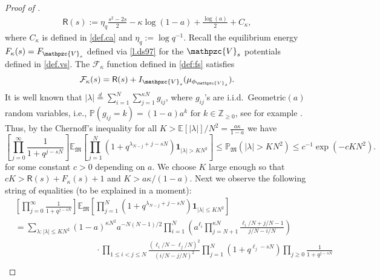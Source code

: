 \documentclass[reqno,11pt]{amsart}
\newcommand{\h}{\mathfrak{h}}
\renewcommand{\Pr}{\mathbb{P}}
\newcommand{\Ex}{\mathbb{E}}
\newcommand{\logq}{\eta_q}
\numberwithin{equation}{section}
\theoremstyle{definition}
\newcommand{\Z}{\mathbb{Z}}
\begin{document}
\begin{proof}[Proof of ]
\begin{align}
    \label{def:mrs}
    \mathsf{R}(s):=\logq\frac{s^2-2s}{2}-\kappa\log (1-a)+\frac{\log(a)}{2}+C_{\kappa},
\end{align} where $C_\kappa$ is defined in \eqref{def.ca} and $\logq:=\log q^{-1}$. Recall the equilibrium energy $F_\kappa(s)=F_{\mathpzc{V}_s}$ defined via \eqref{l.ds97} for the $\mathpzc{V}_s$ potentials defined in \eqref{def.vs}. The $\mathcal{F}_{\kappa}$ function defined in \eqref{def:fs} satisfies
\begin{align}
    \label{idenf}
    \mathcal{F}_\kappa(s)= \mathsf{R}(s)+I_{\mathpzc{V}_s}(\mu_{\phi_{\mathpzc{V}_s}}).
\end{align}
It is well known that $|\lambda|\stackrel{d}{=}\sum_{i=1}^N\sum_{j=1}^{\kappa N} g_{ij}$, where $g_{ij}$'s are i.i.d.~Geometric$(a)$ random variables, i.e., $\Pr(g_{ij}=k)=(1-a)a^k \mbox{ for } k\in \Z_{\ge 0}$, see for example \cite{Johansson_growth_matrices,johansson2000shape}. Thus, by the Chernoff's inequality for all $K>\Ex[|\lambda|]/N^2=\frac{a\kappa}{1-a}$  we have
    \begin{equation}\label{e.tail}
      \left[\prod_{j=0}^\infty \frac{1}{1+q^{j-sN}}\right]\mathbb{E}_{\mathfrak{M}}\left[\prod_{j=1}^N(1+q^{\lambda_{N-j}+j-sN})\mathbf{1}_{|\lambda|>KN^2}\right]  \le \mathbb{P}_{\mathfrak{M}}\left({|\lambda|>KN^2}\right) \le c^{-1}\exp(-cKN^2).
    \end{equation}
for some constant $c>0$ depending on $a$. 
We choose $K$ large enough so that $cK> \mathsf{R}(s)+F_\kappa(s)+1$ and $K>a\kappa/(1-a)$. Next we observe the following string of equalities (to be explained in a moment): 
\begin{align}
\label{e.smidens}
   &  \left[\prod_{j=0}^\infty \frac{1}{1+q^{j-sN}}\right]\mathbb{E}_{\mathfrak{M}}\left[\prod_{j=1}^N(1+q^{\lambda_{N-j}+j-sN})\mathbf{1}_{|\lambda| \le KN^2}\right]  %
   \\ \label{e.smiden3} & = \sum_{\lambda : |\lambda|\le KN^2}(1-a)^{\kappa N^2}a^{-N(N-1)/2}\prod_{i=1}^{N}\left(a^{\ell_i}\prod_{j=N+1}^{\kappa N}\frac{\ell_i/N+j/N-1}{j/N-i/N}\right) \\ & \hspace{4cm}\cdot \prod_{1\leq i<j\leq N}\frac{(\ell_i/N-\ell_j/N)^2}{(i/N-j/N)^2}\prod_{j=1}^{N}(1+q^{\ell_{j}-sN})\prod_{j\ge 0}\frac{1}{1+q^{j-sN}}\\

\end{align}
\end{proof}
\end{document}
